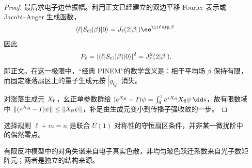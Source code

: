\begin{proof}
最后求电子边带振幅。利用正文已经建立的双边平移 Fourier 表示或 Jacobi--Anger 生成函数，
\begin{equation*}
\langle\ell|S_{\rm cl}(\beta)|0\rangle
=J_\ell(2|\beta|)\ee^{\ii\ell\arg\beta}.
\end{equation*}
因此
\begin{equation*}
P_\ell
=\left|\langle\ell|S_{\rm cl}(\beta)|0\rangle\right|^2
=J_\ell^2(2|\beta|),
\end{equation*}
即正文。在这一极限中，“经典 PINEM”的数学含义是：相干平均场 \(\beta\) 保持有限，而固定涨落扇区上的量子生成元按 \(|g_{\mathrm Q}|\) 消失。

对涨落生成元 $X_{\rm fl}$，幺正单参数群给 $(e^{X_{\rm fl}}-I)\psi=\int_0^1e^{sX_{\rm fl}}X_{\rm fl}\psi\,\dd s$，故有限数域中 $\|(e^{X_{\rm fl}}-I)\psi\|\le\|X_{\rm fl}\psi\|$，补足由生成元变小到传播子强收敛的一步。
\end{proof}




选择规则 $\ell+m=n$ 是联合 $U(1)$ 对称性的守恒扇区条件，并非某一微扰阶中的偶然零点。

有限反冲模型中的对角失谐来自电子真实色散，非均匀玻色跃迁系数来自光子数矩阵元；两者是独立的结构来源。



